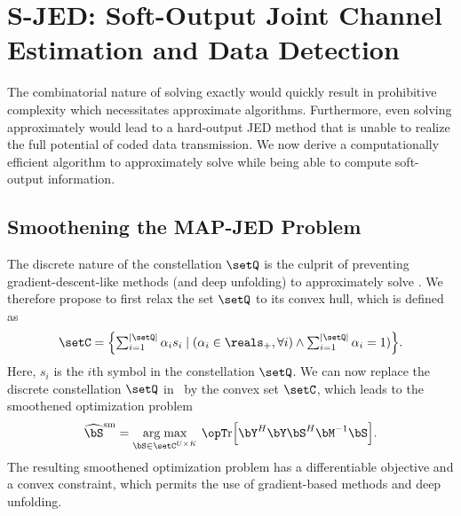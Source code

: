 \section{S-JED: Soft-Output Joint Channel \\ Estimation and Data Detection}\label{sec:JED}


%
The combinatorial nature of solving  exactly would quickly result in prohibitive complexity  which necessitates approximate algorithms. 
%
Furthermore, even solving   approximately would lead to a hard-output JED method that is unable to realize the full potential of coded data transmission. 
%
We now derive a computationally efficient algorithm to approximately solve  while being able to compute soft-output information. 
%
\subsection{Smoothening the MAP-JED Problem}\label{sec:convex relaxation}
The discrete nature of the constellation $\setQ$ is the culprit of preventing gradient-descent-like methods (and deep unfolding) to approximately solve . We therefore propose to first relax the set  $\setQ$ to its convex hull, which is defined as \cite{castaneda2017vlsi}
\begin{align}
\setC = \textstyle \left\{\sum_{i=1}^{|\setQ|}\alpha_i s_i \mid (\alpha_i\in\reals_+,\forall i) \wedge \sum_{i=1}^{|\setQ|}\alpha_i =1 )\right\}\!.
\end{align}
Here,  $s_i$  is the $ i $th symbol in the constellation $ \setQ $. We can now replace the discrete constellation $\setQ$ in~ by the convex set $\setC$, which leads to the smoothened optimization problem 
%
\begin{align}\label{eq:opt2}
\widehat{\bS}^\text{sm} =  \argmax\limits_{\bS\in\setC^{U\times K}} \, \Tr\!\left[\bY^H\bY\bS^H\bM^{-1}\bS\right]\!.
\end{align}
%
The resulting smoothened optimization problem has a differentiable objective and a convex constraint, which permits the use of gradient-based methods and deep unfolding. 



